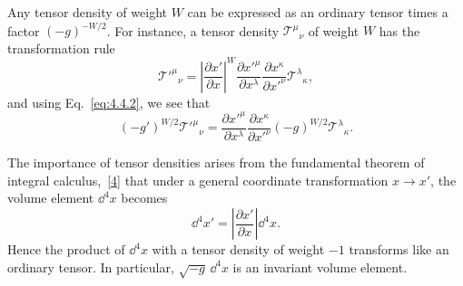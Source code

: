 Any tensor density of weight \(W\) can be expressed as an ordinary tensor
times a factor \((-g)^{-W/2}\). For instance, a tensor density
\(\mathcal T^\mu{}_\nu\) of weight \(W\) has the transformation rule
\begin{equation}
  \mathcal T'^\mu{}_\nu
  =
  \left\lvert\frac{\partial x'}{\partial x}\right\rvert^W
  \frac{\partial x'^\mu}{\partial x^\lambda}
  \frac{\partial x^\kappa}{\partial x'^\nu}
  \mathcal T^\lambda{}_\kappa,
  \tag{4.4.4}\label{eq:4.4.4}
\end{equation}
and using Eq.~\eqref{eq:4.4.2}, we see that
\begin{equation}
  (-g')^{W/2}\mathcal T'^\mu{}_\nu
  =
  \frac{\partial x'^\mu}{\partial x^\lambda}
  \frac{\partial x^\kappa}{\partial x'^\nu}
  (-g)^{W/2}\mathcal T^\lambda{}_\kappa.
  \tag{4.4.5}\label{eq:4.4.5}
\end{equation}

The importance of tensor densities arises from the fundamental theorem of
integral calculus,~\hyperref[ch4-ref-4]{[4]} that under a general coordinate
transformation \(x\to x'\), the volume element \(\dd^4x\) becomes
\begin{equation}
  \dd^4x'
  =
  \left\lvert\frac{\partial x'}{\partial x}\right\rvert\dd^4x.
  \tag{4.4.6}\label{eq:4.4.6}
\end{equation}
Hence the product of \(\dd^4x\) with a tensor density of weight \(-1\)
transforms like an ordinary tensor. In particular,
\(\sqrt{-g}\,\dd^4x\) is an invariant volume element.

